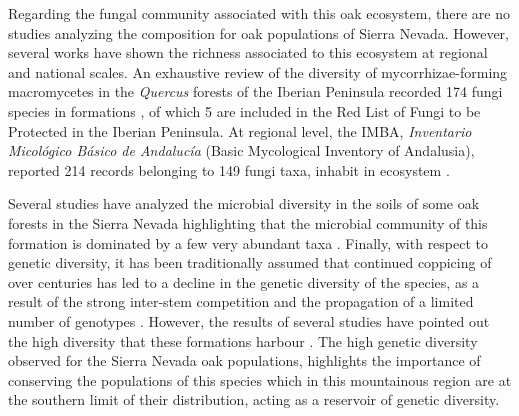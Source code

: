 Regarding the fungal community associated with this oak ecosystem, there are no studies analyzing the composition for oak populations of Sierra Nevada. However, several works have shown the richness associated to this ecosystem at regional and national scales. An exhaustive review of the diversity of mycorrhizae-forming macromycetes in the \emph{Quercus} forests of the Iberian Peninsula recorded 174 fungi  species in \Qp formations \autocites{Ortegaetal2010MycorrhizalMacrofungi}, of which 5 are included in the Red List of Fungi to be Protected in the Iberian Peninsula. At regional level, the IMBA, \emph{Inventario Micológico Básico de Andalucía} (Basic Mycological Inventory of Andalusia), reported 214 records belonging to 149 fungi taxa, inhabit in \Qp ecosystem \autocites{MorenoArroyo2004InventarioMicologico}. 

Several studies have analyzed the microbial diversity in the soils of some oak forests in the Sierra Nevada highlighting that the microbial community of this formation is dominated by a few very abundant taxa \autocites{CoboDiaz2017,Lasaetal2019BacteriaEndosphere, Lasaetal2019MetabarcodingReveals}. Finally, with respect to genetic diversity, it has been traditionally assumed that continued coppicing of \Qp over centuries has led to a decline in the genetic diversity of the species, as a result of the strong inter-stem competition and the propagation of a limited number of genotypes 
\autocites{SanchezPalomaresetal2008EstacionesEcologicas,Bravoetal2008SelviculturaMontes}. However, the results of several studies have pointed out the high diversity that these formations harbour \autocites{ValbuenaCarabanaGil2013GeneticResilience,ValbuenaCarabanaGil2013ReduceAprovechamiento,ValbuenaCarabanaGil2014EfectosGestion,ValbuenaCarabanaGil2017CentenaryCoppicing}. The high genetic diversity observed for the Sierra Nevada oak populations, highlights the importance of conserving the populations of this species which in this mountainous region are at the southern limit of their distribution, acting as a reservoir of genetic diversity. 

